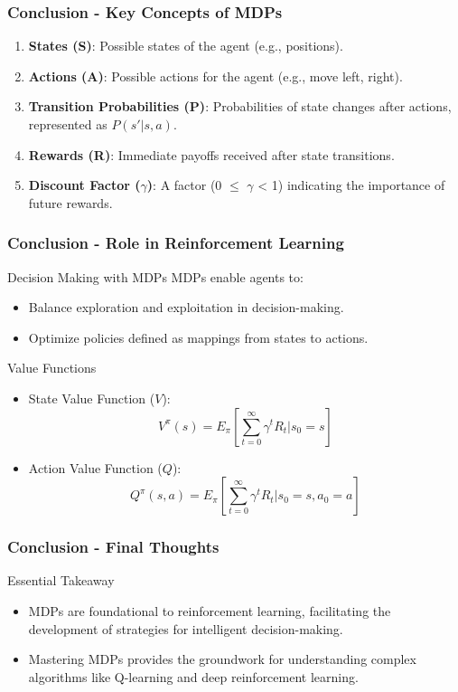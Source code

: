 \documentclass[aspectratio=169]{beamer}
\begin{document}
\begin{frame}[fragile]
    \frametitle{Conclusion - Key Concepts of MDPs}
    \begin{enumerate}
        \item \textbf{States (S)}: Possible states of the agent (e.g., positions).
        \item \textbf{Actions (A)}: Possible actions for the agent (e.g., move left, right).
        \item \textbf{Transition Probabilities (P)}: Probabilities of state changes after actions, represented as \( P(s'|s,a) \).
        \item \textbf{Rewards (R)}: Immediate payoffs received after state transitions.
        \item \textbf{Discount Factor ($\gamma$)}: A factor (0 $\leq$ $\gamma$ < 1) indicating the importance of future rewards.
    \end{enumerate}
\end{frame}

\begin{frame}[fragile]
    \frametitle{Conclusion - Role in Reinforcement Learning}
    \begin{block}{Decision Making with MDPs}
        MDPs enable agents to:
        \begin{itemize}
            \item Balance exploration and exploitation in decision-making.
            \item Optimize policies defined as mappings from states to actions.
        \end{itemize}
    \end{block}

    \begin{block}{Value Functions}
        \begin{itemize}
            \item State Value Function ($V$): 
            \[
            V^{\pi}(s) = E_{\pi} \left[ \sum_{t=0}^{\infty} \gamma^t R_t | s_0=s \right]
            \]
            \item Action Value Function ($Q$): 
            \[
            Q^{\pi}(s, a) = E_{\pi} \left[ \sum_{t=0}^{\infty} \gamma^t R_t | s_0=s, a_0=a \right]
            \]
        \end{itemize}
    \end{block}
\end{frame}

\begin{frame}[fragile]
    \frametitle{Conclusion - Final Thoughts}
    \begin{block}{Essential Takeaway}
        \begin{itemize}
            \item MDPs are foundational to reinforcement learning, facilitating the development of strategies for intelligent decision-making.
            \item Mastering MDPs provides the groundwork for understanding complex algorithms like Q-learning and deep reinforcement learning.
        \end{itemize}
    \end{block}
\end{frame}
\end{document}
